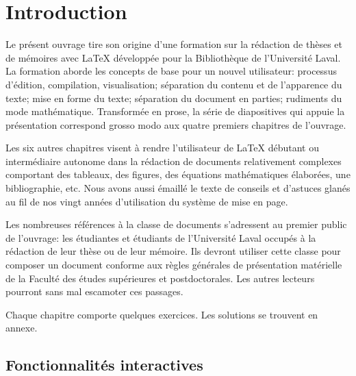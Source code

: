 
\chapter{Introduction}
\label{chap:introduction}

Le présent ouvrage tire son origine d'une formation sur la rédaction
de thèses et de mémoires avec {\LaTeX} développée pour la Bibliothèque
de l'Université Laval. La formation aborde les concepts de base pour
un nouvel utilisateur: processus d'édition, compilation,
visualisation; séparation du contenu et de l'apparence du texte; mise
en forme du texte; séparation du document en parties; rudiments du
mode mathématique. Transformée en prose, la série de diapositives qui
appuie la présentation correspond grosso modo aux quatre premiers
chapitres de l'ouvrage.

Les six autres chapitres visent à rendre l'utilisateur de {\LaTeX}
débutant ou intermédiaire autonome dans la rédaction de documents
relativement complexes comportant des tableaux, des figures, des
équations mathématiques élaborées, une bibliographie, etc. Nous avons
aussi émaillé le texte de conseils et d'astuces glanés au fil de nos
vingt années d'utilisation du système de mise en page.

Les nombreuses références à la classe de documents 
s'adressent au premier public de l'ouvrage: les étudiantes et
étudiants de l'Université Laval occupés à la rédaction de leur thèse
ou de leur mémoire. Ils devront utiliser cette classe pour composer un
document conforme aux règles générales de présentation matérielle de
la Faculté des études supérieures et postdoctorales. Les autres
lecteurs pourront sans mal escamoter ces passages.

Chaque chapitre comporte quelques exercices. Les solutions se trouvent
en annexe.

\section*{Fonctionnalités interactives}

